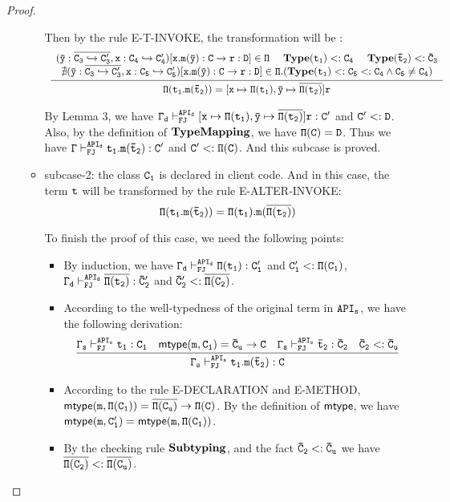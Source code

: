 \documentclass[letterpaper]{article}
\newcommand{\env}[2]{\vdash_{#1}^{#2}}
\begin{document}
\begin{proof}
\begin{itemize}
\begin{itemize}
    Then by the rule E-T-INVOKE, the transformation will be :
    \[
      \begin{array}{c}
        \infer
        {\tt \Pi(t_1.m(\bar{t}_2))=[x\mapsto\Pi(t_1), \bar{y}\mapsto\overline{\Pi(t_2)}]r}
        {
          \begin{array}{c c}
            \tt (\bar{y}:\overline{C_3\hookrightarrow C'_3}, x:C_4\hookrightarrow C'_4)[x.m(\bar{y}):C\rightarrow r:D]\in\Pi ~~~~
            \tt \mathbf{Type}(t_1) <: C_4 ~~~~ \mathbf{Type}(\bar{t}_2)<:\bar{C}_3 \\
            \tt \nexists (\bar{y}:\overline{C_3\hookrightarrow C'_3}, x:C_5\hookrightarrow C'_5)[x.m(\bar{y}):C\rightarrow r:D]\in\Pi.(\mathbf{Type}(t_1)<:C_5<:C_4 \land C_5\neq C_4)
          \end{array}
        }
      \end{array}
    \]

    By Lemma 3, we have $\tt \Gamma_d\env{FJ}{API_d}[x\mapsto\Pi(t_1), \bar{y}\mapsto\overline{\Pi(t_2)}]r:C'$ and $\tt C'<:D$. Also, by the definition of $\tt \mathbf{TypeMapping}$, we have $\tt \Pi(C)=D$. Thus we have $\tt\Gamma\env{FJ}{API_d}t_1.m(\bar{t}_2):C'$ and $\tt C'<:\Pi(C)$. And this subcase is proved.

    \item subcase-2: the class $\tt C_1$ is declared in client code. And in this case, the term $\tt t$ will be transformed by the rule E-ALTER-INVOKE:
    $$\tt \Pi(t_1.m(\bar{t}_2))=\Pi(t_1).m(\overline{\Pi(t_2)})$$

    To finish the proof of this case, we need the following points:
    \begin{itemize}
      \item By induction, we have $\tt \Gamma_d\env{FJ}{API_d}\Pi(t_1):C'_1$ and $\tt C'_1<:\Pi(C_1)$, $\tt \Gamma_d\env{FJ}{API_d}\overline{\Pi(t_2)}:\bar{C}'_2$ and $\tt \bar{C}'_2 <: \overline{\Pi(C_2)}$.
      \item According to the well-typedness of the original term in $\tt API_s$, we have the following derivation:
        \[
          \begin{array}{ccc}
            \infer
            { \tt \Gamma_s\env{FJ}{API_s}t_1.m(\bar{t}_2):C}
            {
               \tt \Gamma_s\env{FJ}{API_s}t_1:C_1
              &\tt \mathsf{mtype}(m,C_1)=\bar{C}_u\rightarrow C
              &\tt \Gamma_s\env{FJ}{API_s}\bar{t}_2:\bar{C}_2
              &\tt \bar{C}_2 <:\bar{C}_u
            }
          \end{array}
        \]
      \item According to the rule E-DECLARATION and E-METHOD, $\tt\mathsf{mtype}(m, \Pi(C_1))=\overline{\Pi(C_u)}\rightarrow \Pi(C)$. By the definition of $\tt\mathsf{mtype}$, we have $\tt \mathsf{mtype}(m,C'_1)=\mathsf{mtype}(m,\Pi(C_1))$.
      \item By the checking rule $\tt \mathbf{Subtyping}$, and the fact $\tt\bar{C}_2 <:\bar{C}_u$ we have $\tt \overline{\Pi(C_2)}<:\overline{\Pi(C_u)}$.
    \end{itemize}


\end{itemize}
\end{itemize}
\end{proof}
\end{document}
